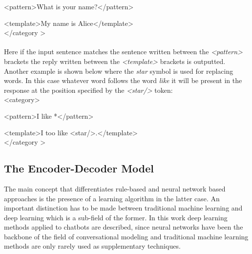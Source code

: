 \documentclass[12pt]{article}
\begin{document}
{\color{OliveGreen}\textless pattern\textgreater}What is your name?{\color{OliveGreen}\textless/pattern\textgreater}

{\color{OliveGreen}\textless template\textgreater}My name is Alice{\color{OliveGreen}\textless/template\textgreater}\\
{\color{OliveGreen}\textless/category \textgreater}\\
\\
Here if the input sentence matches the sentence written between the \textit{\textless pattern\textgreater} brackets the reply written between the \textit{\textless template\textgreater} brackets is outputted.\\
Another example is shown below where the \textit{star} symbol is used for replacing words. In this case whatever word follows the word \textit{like} it will be present in the response at the position specified by the \textit{\textless star/\textgreater} token:\\
{\color{OliveGreen}\textless category\textgreater}

{\color{OliveGreen}\textless pattern\textgreater}I like *{\color{OliveGreen}\textless/pattern\textgreater}

{\color{OliveGreen}\textless template\textgreater}I too like {\color{OliveGreen}\textless star/\textgreater}.{\color{OliveGreen}\textless/template\textgreater}\\
{\color{OliveGreen}\textless/category \textgreater}\\

\subsection{The Encoder-Decoder Model} \label{ssec:23}
The main concept that differentiates rule-based and neural network based approaches is the presence of a learning algorithm in the latter case. An important distinction has to be made between traditional machine learning and deep learning which is a sub-field of the former. In this work deep learning methods applied to chatbots are described, since neural networks have been the backbone of the field of conversational modeling and traditional machine learning methods are only rarely used as supplementary techniques.   
\end{document}
